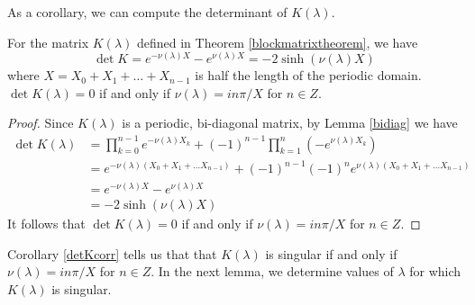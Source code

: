 \documentclass[thesis.tex]{subfiles}
\begin{document}
As a corollary, we can compute the determinant of $K(\lambda)$.
\begin{corollary}\label{detKcorr}
For the matrix $K(\lambda)$ defined in Theorem \ref{blockmatrixtheorem}, we have 
\begin{equation}\label{detK}
\det K = e^{-\nu(\lambda)X} - e^{\nu(\lambda)X} = -2 \sinh (\nu(\lambda) X)
\end{equation}
where $X = X_0 + X_1 + \dots + X_{n-1}$ is half the length of the periodic domain. $\det K(\lambda) = 0$ if and only if $\nu(\lambda) = i n \pi/X$ for $n \in Z$. 
\begin{proof}
Since $K(\lambda)$ is a periodic, bi-diagonal matrix, by Lemma \ref{bidiag} we have
\begin{align*}
\det K(\lambda) &= \prod_{k = 0}^{n-1} e^{-\nu(\lambda)X_k} + (-1)^{n-1} \prod_{k = 1}^n (-e^{\nu(\lambda)X_k}) \\
&= e^{-\nu(\lambda)(X_0 + X_1 + \dots X_{n-1})} + (-1)^{n-1} (-1)^n e^{\nu(\lambda)(X_0 + X_1 + \dots X_{n-1})} \\
&= e^{-\nu(\lambda)X} - e^{\nu(\lambda)X} \\
&= -2 \sinh (\nu(\lambda)X)
\end{align*}
It follows that $\det K(\lambda) = 0$ if and only if $\nu(\lambda) = i n \pi/X$ for $n \in Z$.
\end{proof}
\end{corollary}

Corollary \ref{detKcorr} tells us that that $K(\lambda)$ is singular if and only if $\nu(\lambda) = i n \pi/X$ for $n \in Z$. In the next lemma, we determine values of $\lambda$ for which $K(\lambda)$ is singular. 
\end{document}
